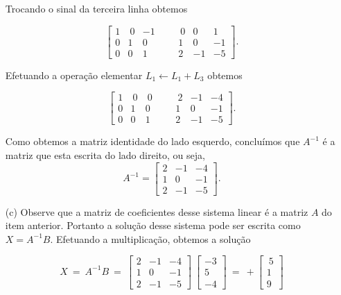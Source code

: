\begin{solution}
\begin{itemize}
Trocando o sinal da terceira linha obtemos

$$\left[ \begin{array}{rrrr|rrrr}
 1 & \ 0 &  -1   & & &   \ 0 &    0 &    1  \\
 0 &   1 &   0   & & &     1 &    0 &   -1  \\   
 0 &   0 &   1   & & &     2 &   -1 &   -5
\end{array} \right] .$$

Efetuando a operação elementar $L_1 \leftarrow L_1 + L_3$ obtemos

$$\left[ \begin{array}{rrrr|rrrr}
 1 & \ 0 & \ 0   & & &   \ 2 &   -1 &   -4  \\
 0 &   1 &   0   & & &     1 &    0 &   -1  \\   
 0 &   0 &   1   & & &     2 &   -1 &   -5
\end{array} \right] .$$

Como obtemos a matriz identidade do lado esquerdo, concluímos que $A^{-1}$ é a matriz que esta escrita do lado direito, ou seja,
$$A^{-1} = \left[ \begin{array}{rrrr}
 2 &  -1 & -4  \\
 1 &   0 & -1  \\
 2 &  -1 & -5 
\end{array} \right] .$$


\item[(c)] Observe que a matriz de coeficientes desse sistema linear é a matriz $A$ do item anterior.
Portanto a solução desse sistema pode ser escrita como $X = A^{-1} B$. Efetuando a multiplicação, obtemos a solução

$$X\ =\ A^{-1} B\ =\ \left[ \begin{array}{rrrr}
 2 &  -1 & -4  \\
 1 &   0 & -1  \\
 2 &  -1 & -5 
\end{array} \right] \ 
\left[ \begin{array}{r} -3 \\ 5 \\ -4 \end{array} \right]\ =\ +\left[ \begin{array}{r} \ 5 \\ 1 \\ 9 \end{array} \right]$$

\end{itemize}
\end{solution}


